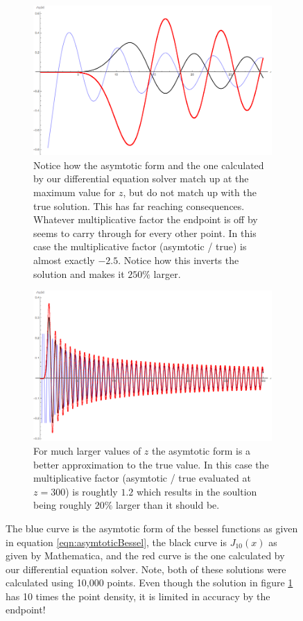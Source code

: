 \documentclass[onecolumn, groupedaddress, 10pt]{revtex4-1}
\begin{document}
\begin{figure}[t]
	\centering
	\begin{subfigure}{.5\textwidth}
  		\centering
  		\includegraphics[width=.9\linewidth]{BesselBadBoundary.png}
  		\caption{\label{fig:BesselBadBoundary} Notice how the asymtotic form and the one calculated by our differential equation solver match up at the maximum value for $z$, but do not match up with the true solution.  This has far reaching consequences.  Whatever multiplicative factor the endpoint is off by seems to carry through for every other point.  In this case the multiplicative factor (asymtotic / true) is almost exactly $-2.5$.  Notice how this inverts the solution and makes it $250\%$ larger.}
	\end{subfigure}%
	\begin{subfigure}{.5\textwidth}
  		\centering
  		\includegraphics[width=.9\linewidth]{BesselGoodBoundary.png}
  		\caption{\label{fig:BesselGoodBoundary} For much larger values of $z$ the asymtotic form is a better approximation to the true value.  In this case the multiplicative factor (asymtotic / true evaluated at $z=300$) is roughtly $1.2$ which results in the soultion being roughly $20\%$ larger than it should be.}
	\end{subfigure}
	\caption{The blue curve is the asymtotic form of the bessel functions as given in equation \ref{eqn:asymtoticBessel}, the black curve is $J_{10} (x)$ as given by Mathematica, and the red curve is the one calculated by our differential equation solver.  Note, both of these solutions were calculated using 10,000 points.  Even though the solution in figure \ref{fig:BesselBadBoundary} has 10 times the point density, it is limited in accuracy by the endpoint!}
\end{figure}
\end{document}
